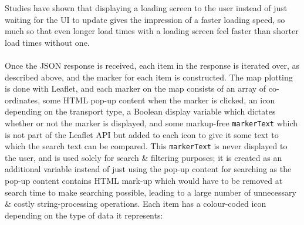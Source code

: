 \documentclass[a4paper,11pt]{report}
\begin{document}
Studies have shown that displaying a loading screen to the user instead of just waiting for the UI to update gives the impression of a faster loading speed, so much so that even longer load times with a loading screen feel faster than shorter load times without one\supercite{mdnperceivedperformance, persson2019perceived, Vladic2020LoadingAnimations}.
\\\\
Once the JSON response is received, each item in the response is iterated over, as described above, and the marker for each item is constructed.
The map plotting is done with Leaflet\supercite{leaflet}, and each marker on the map consists of an array of co-ordinates, some HTML pop-up content when the marker is clicked, an icon depending on the transport type, a Boolean display variable which dictates whether or not the marker is displayed, and some markup-free \texttt{markerText} which is not part of the Leaflet API\supercite{leaflet} but added to each icon to give it some text to which the search text can be compared.
This \texttt{markerText} is never displayed to the user, and is used solely for search \& filtering purposes;
it is created as an additional variable instead of just using the pop-up content for searching as the pop-up content contains HTML mark-up which would have to be removed at search time to make searching possible, leading to a large number of unnecessary \& costly string-processing operations.
Each item has a colour-coded icon depending on the type of data it represents:
\end{document}
